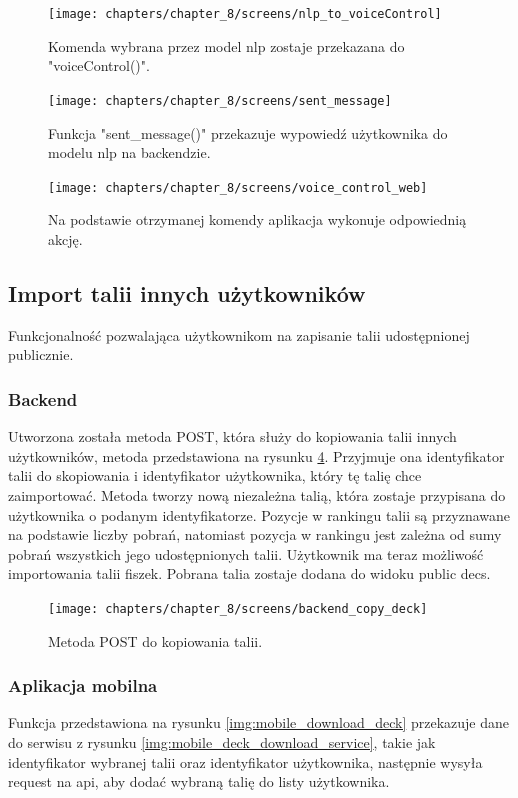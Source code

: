 \begin{figure}[H]
    \centering
    \texttt{[image: chapters/chapter\_8/screens/nlp\_to\_voiceControl]}
    \caption{Komenda wybrana przez model nlp zostaje przekazana do "voiceControl()".}
    \label{img:nlp_to_voiceControl}
\end{figure}

\begin{figure}[H]
    \centering
    \texttt{[image: chapters/chapter\_8/screens/sent\_message]}
    \caption{Funkcja "sent\_message()" przekazuje wypowiedź użytkownika do modelu nlp na backendzie.}
    \label{img:sent_message}
\end{figure}

\begin{figure}[H]
    \centering
    \texttt{[image: chapters/chapter\_8/screens/voice\_control\_web]}
    \caption{Na podstawie otrzymanej komendy aplikacja wykonuje odpowiednią akcję.}
    \label{img:voice_control_web}
\end{figure}

\subsection{Import talii innych użytkowników}
Funkcjonalność pozwalająca użytkownikom na zapisanie talii udostępnionej publicznie.

\subsubsection{Backend}
Utworzona została metoda POST, która służy do kopiowania talii innych użytkowników, metoda przedstawiona na rysunku \ref{img:backend_copy_deck}. Przyjmuje ona identyfikator talii do skopiowania i identyfikator użytkownika, który tę talię chce zaimportować. Metoda tworzy nową niezależna talią, która zostaje przypisana do użytkownika o podanym identyfikatorze. Pozycje w rankingu talii są przyznawane na podstawie liczby pobrań, natomiast pozycja w rankingu jest zależna od sumy pobrań wszystkich jego udostępnionych talii. Użytkownik ma teraz możliwość importowania talii fiszek. Pobrana talia zostaje dodana do widoku public decs.

\begin{figure}[H]
    \centering
    \texttt{[image: chapters/chapter\_8/screens/backend\_copy\_deck]}
    \caption{Metoda POST do kopiowania talii.}
    \label{img:backend_copy_deck}
\end{figure}

\subsubsection{Aplikacja mobilna}
Funkcja przedstawiona na rysunku \ref{img:mobile_download_deck} przekazuje dane do serwisu z rysunku \ref{img:mobile_deck_download_service}, takie jak identyfikator wybranej talii oraz identyfikator użytkownika, następnie wysyła request na api, aby dodać wybraną talię do listy użytkownika.

